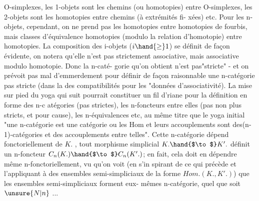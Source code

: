 
O-simplexes, les 1-objets sont les chemins  (ou homotopies) entre
O-simplexes, les 2-objets sont les homotopies entre chemins (à extrémités fi-%
xées) etc. Pour les n-objets, cependant, on ne prend pas les homotopies
entre homotopies de fourbis, mais classes d'équivalence homotopies
(modulo la relation d'homotopie) entre homotopies. La composition des
i-objets ($i\hand{\geq}1$) se définit de façon évidente, on notera qu'elle n'est pas
strictement associative, mais associative modulo homotopie. Donc la n-caté-%
gorie qu'on obtient n'est pas"stricte" - et on prévoit pas mal d'emmerdement
pour définir de façon raisonnable une n-catégorie pas stricte (dans la
\hand{/}des compatibilités  pour les "données d'associativité). La
mise sur pied du yoga qui suit pourrait constituer un fil d'riane pour la
définition en forme des n-c atégories (pas strictes), les n-foncteurs entre
elles (pas non plus stricts, et pour cause), les n-équivalences etc, au
même titre que le yoga initial "une n-catégorie est une catégorie ou les
Hom et leurs accouplements sont des(n-1)-catégories et des accouplements
entre telles". Cette n-catégorie dépend fonctoriellement de $K.$ , tout
morphisme simplicial $K. \hand{$\to$} K'.$ définit un n-foncteur $C_n(K.)\hand{$\to$}C_n(K'.)$; en
fait, cela doit en dépendre même n-fonctoriellement, vu qu'on voit (en s'in%
spirant de ce qui précède et l'appliquant à des ensembles semi-simpliciaux
de la forme $Hom.(K.,K'.)$) que les ensembles semi-simpliciaux forment eux-%
mêmes  n-catégorie, quel que soit $\unsure{N|n}$ ...

